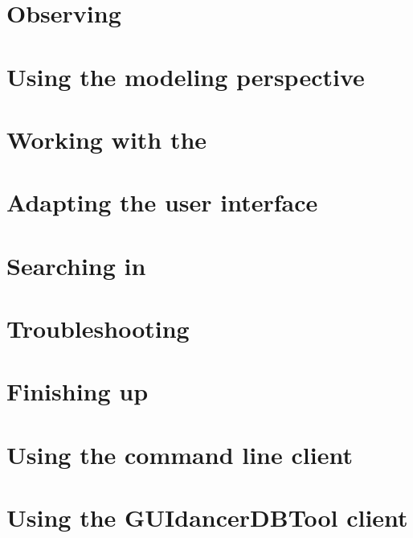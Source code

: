 \clearpage

\section{Observing \gdcases} 


\clearpage

\section{Using the modeling perspective}

\clearpage 

\section{Working with the \gdprobview}


\clearpage

\section{Adapting the user interface}

\clearpage
\section{Searching in \gd{}}

\clearpage

\section{Troubleshooting}


\clearpage

\section{Finishing up}


\clearpage

\section{Using the command line client}


\section{Using the GUIdancerDBTool client}
\label{DBTool}

